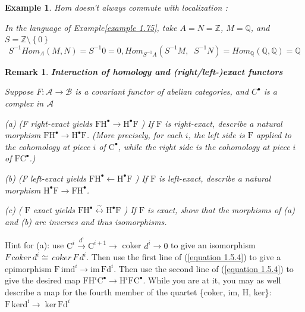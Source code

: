 \documentclass{article}
\newtheorem{example}[theorem]{Example}
\newtheorem{remark}[theorem]{Remark}
\begin{document}
\begin{example}
Hom doesn’t always commute with localization :

In the language of Example\ref{example 1.75}, take $A = N = \mathbb Z$, $M =\mathbb Q$, and $S =\mathbb Z \setminus \left\{0\right\}$
\begin{equation*}
S^{-1} Hom_A(M, N) = S^{-1}0=0,
Hom_{S^{-1}A}(S^{-1}M, \;\;
S^{-1}N)=Hom_\mathbb Q(\mathbb Q,\mathbb Q)=\mathbb Q
\end{equation*}
\end{example}

\begin{remark}
\textbf{Interaction of homology and (right/left-)exact functors}

Suppose $F:\mathscr A \rightarrow \mathscr B$ is a
covariant functor of abelian categories, and $ C
^\bullet$
is a complex in $\mathscr A$

(a) (F right-exact yields $\mathrm{FH}^{\bullet} \longrightarrow \mathrm{H}^{\bullet} \mathrm{F}$ ) If $\mathrm{F}$ is right-exact, describe a natural morphism $\mathrm{FH}^{\bullet} \rightarrow \mathrm{H}^{\bullet} \mathrm{F}$. (More precisely, for each $i$, the left side is $\mathrm{F}$ applied to the cohomology at piece $i$ of $\mathrm{C}^{\bullet}$, while the right side is the cohomology at piece $i$ of $\mathrm{FC}^{\bullet}$.)

(b) (F left-exact yields $\mathrm{FH}^{\bullet} \longleftarrow \mathrm{H}^{\bullet} \mathrm{F}$ ) If $\mathrm{F}$ is left-exact, describe a natural morphism $\mathrm{H}^{\bullet} \mathrm{F} \rightarrow \mathrm{FH}^{\bullet}$.

(c) ( $\mathrm{F}$ exact yields $\mathrm{FH}^{\bullet} \stackrel{\sim}{\longleftrightarrow} \mathrm{H}^{\bullet} \mathrm{F}$ ) If $\mathrm{F}$ is exact, show that the morphisms of (a) and (b) are inverses and thus isomorphisms.
\end{remark}

Hint for (a): use $\mathrm{C}^{i} \stackrel{d^{i}}{\longrightarrow} \mathrm{C}^{i+1} \longrightarrow$ coker $d^{i} \longrightarrow 0$ to give an isomorphism $F\, coker\, d^{i} \cong\, coker\,F\, d^{i}$. Then use the first line of (\ref{equation 1.5.4}) to give a epimorphism $\mathrm{F\,im} \mathrm{d}^{i} \longrightarrow \mathrm{im}\, \mathrm{Fd}^{i}$. Then use the second line of (\ref{equation 1.5.4}) to give the desired map $\mathrm{FH}^{i} \mathrm{C}^{\bullet} \longrightarrow \mathrm{H}^{i} \mathrm{FC}^\bullet$. While you are at it, you may as well describe a map for the fourth member of the quartet \{coker, im, H, ker\}: $\operatorname{F\,ker d^{i}} \longrightarrow \operatorname{ker\,Fd}^{i}$
\end{document}
